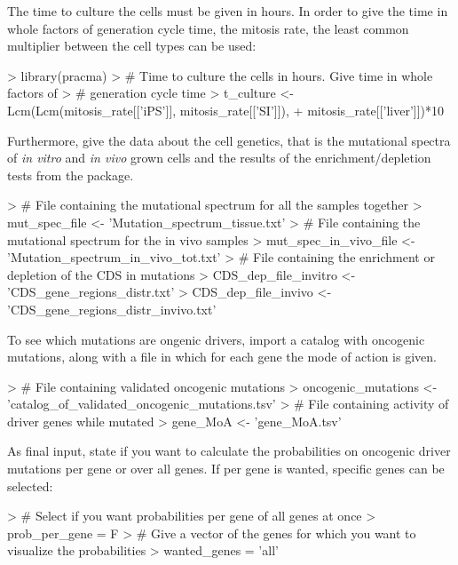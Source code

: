 \documentclass{article}
\begin{document}
The time to culture the cells must be given in hours. In order to give the time
in whole factors of generation cycle time, the mitosis rate, the least common
multiplier between the cell types can be used:

\begin{Schunk}
\begin{Sinput}
> library(pracma)
> # Time to culture the cells in hours. Give time in whole factors of 
> # generation cycle time
> t_culture <- Lcm(Lcm(mitosis_rate[['iPS']], mitosis_rate[['SI']]), 
+                  mitosis_rate[['liver']])*10
\end{Sinput}
\end{Schunk}

Furthermore, give the data about the cell genetics, that is the mutational
spectra of \textit{in vitro} and \textit{in vivo} grown cells and the results
of the enrichment/depletion tests from the 
package.

\begin{Schunk}
\begin{Sinput}
> # File containing the mutational spectrum for all the samples together
> mut_spec_file <- 'Mutation_spectrum_tissue.txt'
> # File containing the mutational spectrum for the in vivo samples
> mut_spec_in_vivo_file <- 'Mutation_spectrum_in_vivo_tot.txt'
> # File containing the enrichment or depletion of the CDS in mutations
> CDS_dep_file_invitro <- 'CDS_gene_regions_distr.txt'
> CDS_dep_file_invivo <- 'CDS_gene_regions_distr_invivo.txt'
\end{Sinput}
\end{Schunk}

To see which mutations are ongenic drivers, import a catalog with oncogenic
mutations, along with a file in which for each gene the mode of action is 
given.

\begin{Schunk}
\begin{Sinput}
> # File containing validated oncogenic mutations
> oncogenic_mutations <- 'catalog_of_validated_oncogenic_mutations.tsv'
> # File containing activity of driver genes while mutated
> gene_MoA <- 'gene_MoA.tsv'
\end{Sinput}
\end{Schunk}

As final input, state if you want to calculate the probabilities on oncogenic
driver mutations per gene or over all genes. If per gene is wanted, specific 
genes can be selected:

\begin{Schunk}
\begin{Sinput}
> # Select if you want probabilities per gene of all genes at once
> prob_per_gene = F
> # Give a vector of the genes for which you want to visualize the probabilities
> wanted_genes = 'all'
\end{Sinput}
\end{Schunk}
\end{document}

